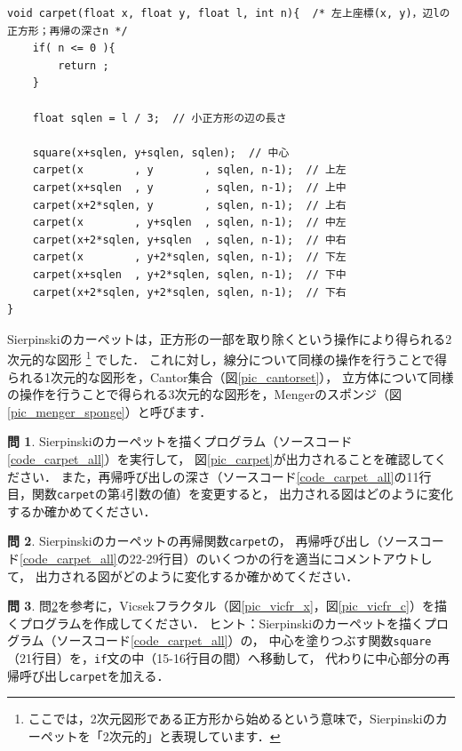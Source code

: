 \documentclass[dvipdfmx]{jsarticle}
\theoremstyle{definition}
\newtheorem{question}{問}[section]
\begin{document}
\begin{lstlisting}[caption=Sierpinskiのカーペットを描く再帰関数, label=code_carpet]
void carpet(float x, float y, float l, int n){  /* 左上座標(x, y)，辺lの正方形；再帰の深さn */
    if( n <= 0 ){
        return ;
    }

    float sqlen = l / 3;  // 小正方形の辺の長さ

    square(x+sqlen, y+sqlen, sqlen);  // 中心
    carpet(x        , y        , sqlen, n-1);  // 上左
    carpet(x+sqlen  , y        , sqlen, n-1);  // 上中
    carpet(x+2*sqlen, y        , sqlen, n-1);  // 上右
    carpet(x        , y+sqlen  , sqlen, n-1);  // 中左
    carpet(x+2*sqlen, y+sqlen  , sqlen, n-1);  // 中右
    carpet(x        , y+2*sqlen, sqlen, n-1);  // 下左
    carpet(x+sqlen  , y+2*sqlen, sqlen, n-1);  // 下中
    carpet(x+2*sqlen, y+2*sqlen, sqlen, n-1);  // 下右
}
\end{lstlisting}

Sierpinskiのカーペットは，正方形の一部を取り除くという操作により得られる2次元的な図形
\footnote{
    ここでは，2次元図形である正方形から始めるという意味で，Sierpinskiのカーペットを「2次元的」と表現しています．
}
でした．
これに対し，線分について同様の操作を行うことで得られる1次元的な図形を，Cantor集合（図\ref{pic_cantorset}），
立方体について同様の操作を行うことで得られる3次元的な図形を，Mengerのスポンジ（図\ref{pic_menger_sponge}）と呼びます．

\begin{question}
    Sierpinskiのカーペットを描くプログラム（ソースコード\ref{code_carpet_all}）を実行して，
    図\ref{pic_carpet}が出力されることを確認してください．
    また，再帰呼び出しの深さ（ソースコード\ref{code_carpet_all}の11行目，関数\texttt{carpet}の第4引数の値）を変更すると，
    出力される図はどのように変化するか確かめてください．
\end{question}

\begin{question}\label{q_carpet_rec}
    Sierpinskiのカーペットの再帰関数\texttt{carpet}の，
    再帰呼び出し（ソースコード\ref{code_carpet_all}の22-29行目）のいくつかの行を適当にコメントアウトして，
    出力される図がどのように変化するか確かめてください．
\end{question}

\begin{question}
    問\ref{q_carpet_rec}を参考に，Vicsekフラクタル（図\ref{pic_vicfr_x}，図\ref{pic_vicfr_c}）を描くプログラムを作成してください．
    ヒント：Sierpinskiのカーペットを描くプログラム（ソースコード\ref{code_carpet_all}）の，
    中心を塗りつぶす関数\texttt{square}（21行目）を，\texttt{if}文の中（15-16行目の間）へ移動して，
    代わりに中心部分の再帰呼び出し\texttt{carpet}を加える．
\end{question}
\end{document}
